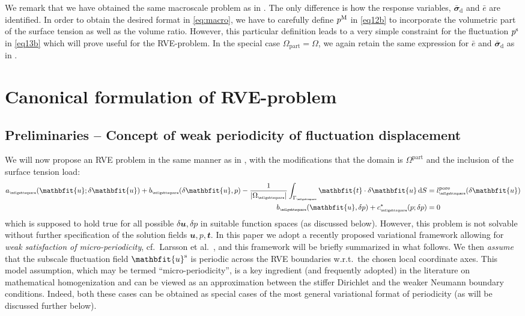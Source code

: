 \documentclass[12pt,a4paper]{article}
\renewcommand{\ta}[1]{\mathbfit{#1}}
\renewcommand{\ts}[1]{\mathbfit{#1}}
\renewcommand{\Box}{\mdlgwhtsquare}
\renewcommand{\dev}{\mathrm{d}}
\newcommand{\volume}{|\Omega_\rve|}
\newcommand{\pore}{\mathrm{pore}}
\newcommand{\particle}{\mathrm{part}}
\newcommand{\rve}{
  {\mathchoice
   {\mbox{\scalebox{0.67}{$\Box$}}}
   {\mbox{\scalebox{0.67}{$\Box$}}}
   {\mbox{\scalebox{0.5}{$\Box$}}}
   {\mbox{\scalebox{0.375}{$\Box$}}}
  }
}
\begin{document}
\todo{**}
We remark that we have obtained the same macroscale problem as in \cite{ohman_computational_2014}.
The only difference is how the response variables, $\bar{\ts\sigma}_\dev$ and $\bar{e}$ are identified.
In order to obtain the desired format in \eqref{eq:macro}, we have to carefully define $p^{\mathrm{M}}$ in \eqref{eq12b} to incorporate the volumetric part of the surface tension as well as the volume ratio. However, this particular definition leads to a very simple constraint for the fluctuation $p^{\mathrm{s}}$ in \eqref{eq13b} which will prove useful for the RVE-problem.
In the special case $\Omega_\particle = \Omega$, we again retain the same expression for $\bar{e}$ and $\bar{\ts\sigma}_\dev$ as in \cite{ohman_computational_2014}.



\section{Canonical formulation of RVE-problem}

\subsection{Preliminaries -- Concept of weak periodicity of fluctuation displacement}

We will now propose an RVE problem in the same manner as in \cite{ohman_computational_2014}, with the modifications that the domain is $\Omega^\particle$ and the inclusion of the surface tension load:
\begin{subequations}
\begin{align}
    a_\rve(\ta{u};\delta\ta{u}) + b_\rve(\delta\ta{u},p) - \frac{1}{\volume}\int_{\Gamma_\rve} \ta{t}\cdot\delta\ta{u} \dif S &= l_\rve^\pore(\delta\ta{u})
\label{eq19a} \\
    b_\rve(\ta{u},\delta p) + c^*_\rve(p;\delta p) &= 0
\label{eq19b}
\end{align}
\end{subequations}
which is supposed to hold true for all possible $\delta\ta{u}, \delta p$ in suitable function spaces (as discussed below).
However, this problem is not solvable without further specification of the solution fields $\ta{u}, p, \ta{t}$.
In this paper we adopt a recently proposed variational framework allowing for \emph{weak satisfaction of micro-periodicity}, cf.\  Larsson et al.\ \cite{larsson_computational_2011}, and this framework will be briefly summarized in what follows.
We then \emph{assume} that the subscale fluctuation field $\ta{u}^\fluct$ is periodic across the RVE boundaries w.r.t.\ the chosen local coordinate axes.
This model assumption, which may be termed ``micro-periodicity'', is a key ingredient (and frequently adopted) in the literature on mathematical homogenization and can be viewed as an approximation between the stiffer Dirichlet and the weaker Neumann boundary conditions.
Indeed, both these cases can be obtained as special cases of the most general variational format of periodicity (as will be discussed further below).
\end{document}
